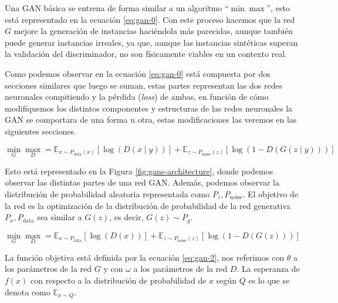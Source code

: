 Una \gls{GAN} básica se entrena de forma similar a un algoritmo ``${\min\max}$'', esto está representado en la ecuación \ref{eq:gan-0}. Con este proceso hacemos que la red ${G}$ mejore la generación de instancias haciéndola más parecidas, aunque también puede generar instancias irreales, ya que, aunque las instancias sintéticas superan la validación del discriminador, no son físicamente viables en un contexto real.


Como podemos observar en la ecuación \ref{eq:gan-0} está compuesta por dos secciones similares que luego se suman, estas partes representan las dos redes neuronales compitiendo y la pérdida (\textit{loss}) de ambas, en función de cómo modifiquemos los distintos componentes y estructuras de las redes neuronales la \gls{GAN} se comportara de una forma u otra, estas modificaciones las veremos en las siguientes secciones.

\begin{equation}
    \min_{G}\max_{D} = \mathbb{E}_{x\sim{}P_{\text{data}}(x)} \left[\log\left(D(x\mid{}y)\right)\right] + \mathbb{E}_{z\sim{}P_{\text{noise}}(z)} \left[\log\left(1-D(G(z\mid{}y))\right)\right]
    \label{eq:gan-0}
\end{equation}

Esto está representado en la Figura \ref{fig:gans-architecture}, donde podemos observar las distintas partes de una red \gls{GAN}. Además, podemos observar la distribución de probabilidad aleatoria representada como ${P_{z}, P_{\text{noise}}}$. El objetivo de la red es la optimización de la distribución de probabilidad de la red generativa ${P_{x}, P_{\text{data}}}$ sea similar a ${G(z)}$, es decir, ${G(z)\sim{}P_{g}}$.

\begin{equation}
    \min_{G}\max_{D} = \mathbb{E}_{x\sim{}P_{\text{data}}} \left[\log\left(D(x)\right)\right] + \mathbb{E}_{z\sim{}P_{\text{noise}}(z)} \left[\log\left(1-D(G(z))\right)\right]
    \label{eq:gan-1}
\end{equation}

La función objetiva está definida por la ecuación \ref{eq:gan-2}, nos referimos con ${\theta}$ a los parámetros de la red ${G}$ y con ${\omega}$ a los parámetros de la red ${D}$. La esperanza de ${f(x)}$ con respecto a la distribución de probabilidad de ${x}$ según ${Q}$ es lo que se denota como ${\mathbb{E}_{x \sim Q}}$.

